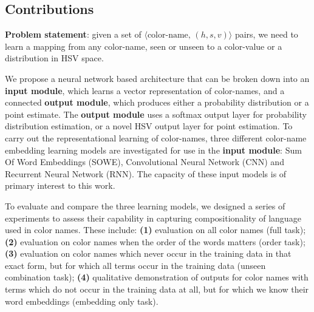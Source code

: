 \documentclass[]{clv3}
\newcommand{\datapairs}{$\langle\text{color-name},\,(h,s,v)\rangle$}
\begin{document}


\subsection{Contributions}
{\bf Problem statement}: given a set of \datapairs{} pairs, we need to learn a mapping from any color-name, seen or unseen to a color-value or a distribution in HSV space.

We propose a neural network based architecture that can be broken down into an 
\textbf{input module}, which learns a vector representation of color-names,
 and a connected \textbf{output module}, which produces either a probability distribution or a  point estimate.
The \textbf{output module} uses a softmax output layer for probability distribution estimation,
or a novel HSV output layer for point estimation. 
To carry out the representational learning of color-names, three different color-name embedding learning models are investigated for use in the \textbf{input module}: Sum Of Word Embeddings (SOWE), Convolutional Neural Network (CNN) and Recurrent Neural Network (RNN).
The capacity of these input models is of primary interest to this work.

To evaluate and compare the three learning models, we designed a series of experiments to assess their capability in capturing compositionality of language used in color names.
These include:
\textbf{(1)} evaluation on all color names (full task);
\textbf{(2)} evaluation on  color names when the order of the words matters (order task);
\textbf{(3)} evaluation on color names which never occur in the training data in that exact form, but for which all terms occur in the training data (unseen combination task);
\textbf{(4)} qualitative demonstration of outputs for color names with terms which do not occur in the training data at all, but for which we know their word embeddings (embedding only task).
\end{document}
